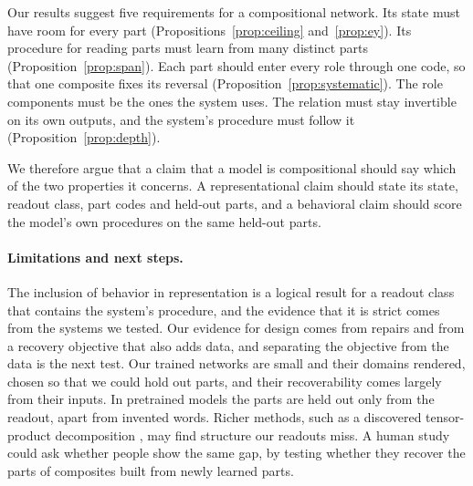 \documentclass[10pt]{article}
\theoremstyle{plain}
\theoremstyle{remark}
\begin{document}
Our results suggest five requirements for a compositional network. Its state must have room for every part (Propositions~\ref{prop:ceiling} and~\ref{prop:ey}). Its procedure for reading parts must learn from many distinct parts (Proposition~\ref{prop:span}). Each part should enter every role through one code, so that one composite fixes its reversal (Proposition~\ref{prop:systematic}). The role components must be the ones the system uses. The relation must stay invertible on its own outputs, and the system's procedure must follow it (Proposition~\ref{prop:depth}).

We therefore argue that a claim that a model is compositional should say which of the two properties it concerns. A representational claim should state its state, readout class, part codes and held-out parts, and a behavioral claim should score the model's own procedures on the same held-out parts.

\paragraph{Limitations and next steps.} The inclusion of behavior in representation is a logical result for a readout class that contains the system's procedure, and the evidence that it is strict comes from the systems we tested. Our evidence for design comes from repairs and from a recovery objective that also adds data, and separating the objective from the data is the next test. Our trained networks are small and their domains rendered, chosen so that we could hold out parts, and their recoverability comes largely from their inputs. In pretrained models the parts are held out only from the readout, apart from invented words. Richer methods, such as a discovered tensor-product decomposition \citep{mccoy2019}, may find structure our readouts miss. A human study could ask whether people show the same gap, by testing whether they recover the parts of composites built from newly learned parts.

\FloatBarrier



\clearpage
\appendix
\makeatletter\let\@fb@secFB\relax\makeatother %
\end{document}
